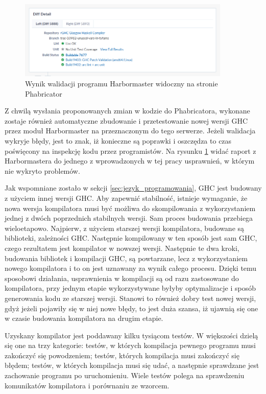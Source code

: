 \begin{figure}[ht]
    \centering
    \includegraphics[width=0.9\textwidth]{images/Phabricator_validate}
    \caption{Wynik walidacji programu Harbormaster widoczny na stronie Phabricator}
    \label{fig:Phabricator_validate}
\end{figure}

Z chwilą wysłania proponowanych zmian w kodzie do Phabricatora, wykonane zostaje
również automatyczne zbudowanie i przetestowanie nowej wersji GHC przez moduł
Harbormaster na przeznaczonym do tego serwerze. Jeżeli walidacja wykryje błędy,
jest to znak, iż konieczne są poprawki i oszczędza to czas poświęcony na
inspekcję kodu przez programistów. Na rysunku \ref{fig:Phabricator_validate}
widać raport z Harbormastera do jednego z wprowadzonych w tej pracy usprawnień,
w którym nie wykryto problemów.

Jak wspomniane zostało w sekcji \ref{sec:jezyk_programowania}, GHC jest budowany
z użyciem innej wersji GHC. Aby zapewnić stabilność, istnieje wymaganie, że nowa
wersja kompilatora musi być możliwa do skompilowania z wykorzystaniem jednej z
dwóch poprzednich stabilnych wersji\cite{WikiFixingBugs}. Sam proces budowania
przebiega wieloetapowo. Najpierw, z użyciem starszej wersji kompilatora,
budowane są biblioteki, zależności GHC. Następnie kompilowany w ten sposób jest
sam GHC, czego rezultatem jest kompilator w nowszej wersji. Następnie te dwa
kroki, budowania bibliotek i kompilacji GHC, są powtarzane, lecz z
wykorzystaniem nowego kompilatora i to on jest uznawany za wynik całego
procesu\cite{WikiBuildSystem}. Dzięki temu sposobowi działania, usprawnienia w
kompilacji są od razu zastosowane do kompilatora, przy jednym etapie
wykorzystywane byłyby optymalizacje i sposób generowania kodu ze starszej
wersji. Stanowi to również dobry test nowej wersji, gdyż jeżeli pojawiły się w
niej nowe błędy, to jest duża szansa, iż ujawnią się one w czasie budowania
kompilatora na drugim etapie.

Uzyskany kompilator jest poddawany kilku tysiącom testów. W większości dzielą
się one na trzy kategorie: testów, w których kompilacja pewnego programu musi
zakończyć się powodzeniem; testów, których kompilacja musi zakończyć się błędem;
testów, w których kompilacja musi się udać, a następnie sprawdzane jest
zachowanie programu po uruchomieniu. Wiele testów polega na sprawdzeniu
komunikatów kompilatora i porównaniu ze wzorcem.
